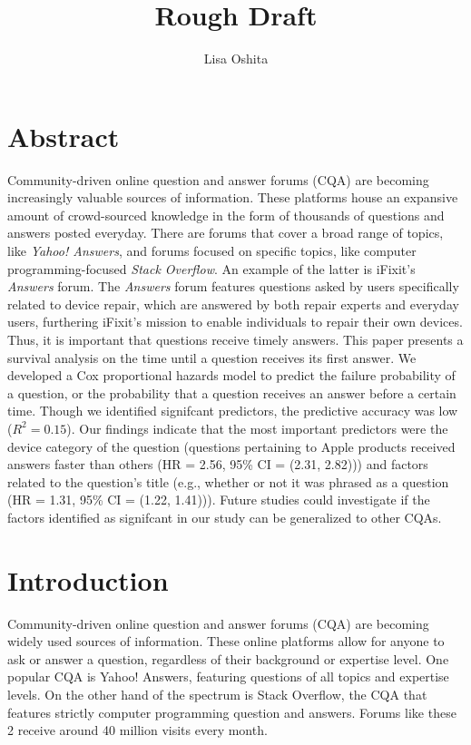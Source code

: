 \documentclass[12pt]{article}
\title{Rough Draft}
\author{Lisa Oshita}
\date{}
\begin{document}
\maketitle

\section{Abstract}

Community-driven online question and answer forums (CQA) are becoming increasingly valuable sources of information. These platforms house an expansive amount of crowd-sourced knowledge in the form of thousands of questions and answers posted everyday. There are forums that cover a broad range of topics, like \textit{Yahoo! Answers}, and forums focused on specific topics, like computer programming-focused \textit{Stack Overflow}. An example of the latter is iFixit's \textit{Answers} forum. The \textit{Answers} forum features questions asked by users specifically related to device repair, which are answered by both repair experts and everyday users, furthering iFixit's mission to enable individuals to repair their own devices. Thus, it is important that questions receive timely answers. This paper presents a survival analysis on the time until a question receives its first answer. We developed a Cox proportional hazards model to predict the failure probability of a question, or the probability that a question receives an answer before a certain time. Though we identified signifcant predictors, the predictive accuracy was low ($R^2 = 0.15$). Our findings indicate that the most important predictors were the device category of the question (questions pertaining to Apple products received answers faster than others (HR = 2.56, 95\% CI = (2.31, 2.82))) and factors related to the question's title (e.g., whether or not it was phrased as a question (HR = 1.31, 95\% CI = (1.22, 1.41))). Future studies could investigate if the factors identified as signifcant in our study can be generalized to other CQAs. 

\section{Introduction}

    Community-driven online question and answer forums (CQA) are becoming widely used sources of information. These online platforms allow for anyone to ask or answer a question, regardless of their background or expertise level. One popular CQA is Yahoo! Answers, featuring questions of all topics and expertise levels. On the other hand of the spectrum is Stack Overflow, the CQA that features strictly computer programming question and answers. Forums like these 2 receive around 40 million visits every month.
    
\end{document}

